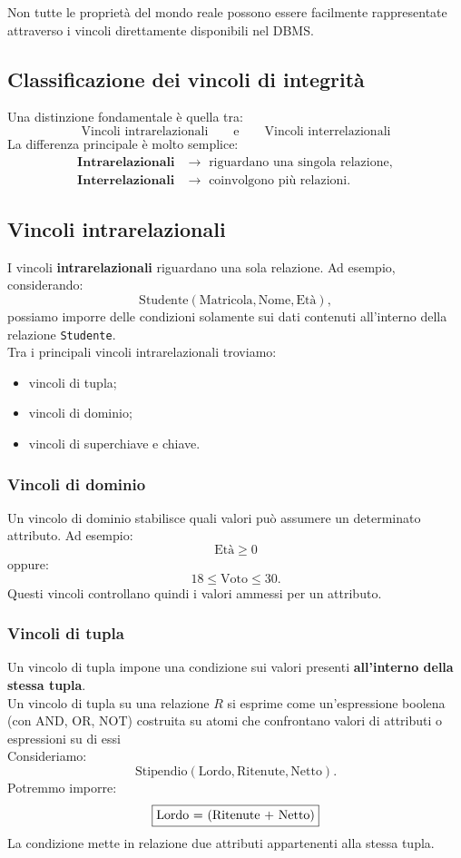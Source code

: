 Non tutte le proprietà del mondo reale possono essere facilmente
rappresentate attraverso i vincoli direttamente disponibili nel DBMS.

\subsection{Classificazione dei vincoli di integrità}
Una distinzione fondamentale è quella tra:
\[
\boxed{
\text{Vincoli intrarelazionali}
\qquad\text{e}\qquad
\text{Vincoli interrelazionali}
}
\]
La differenza principale è molto semplice:
\[
\boxed{
\begin{array}{ll}
\textbf{Intrarelazionali} &
\rightarrow \text{ riguardano una singola relazione}, \\[2mm]
\textbf{Interrelazionali} &
\rightarrow \text{ coinvolgono più relazioni}.
\end{array}
}
\]


\subsection*{Vincoli intrarelazionali}
I vincoli \textbf{intrarelazionali} riguardano una sola relazione.
Ad esempio, considerando:
\[
\text{Studente}(\text{Matricola},\text{Nome},\text{Età}),
\]
possiamo imporre delle condizioni solamente sui dati contenuti
all'interno della relazione \texttt{Studente}.\\
Tra i principali vincoli intrarelazionali troviamo:
\begin{itemize}
    \item vincoli di tupla;
    \item vincoli di dominio;
    \item vincoli di superchiave e chiave.
\end{itemize}
\subsubsection{Vincoli di dominio}
Un vincolo di dominio stabilisce quali valori può assumere
un determinato attributo.
Ad esempio:
\[
\text{Età} \geq 0
\]
oppure:
\[
18 \leq \text{Voto} \leq 30.
\]
Questi vincoli controllano quindi i valori ammessi per un attributo.
\subsubsection{Vincoli di tupla}
Un vincolo di tupla impone una condizione sui valori presenti
\textbf{all'interno della stessa tupla}.\\
Un vincolo di tupla su una relazione $R$ si esprime come un'espressione boolena (con AND, OR, NOT) costruita su atomi che confrontano valori di attributi o espressioni su di essi\\
Consideriamo:
\[
\text{Stipendio}(\text{Lordo},\text{Ritenute},\text{Netto}).
\]
Potremmo imporre:
\[
\boxed{
\text{Lordo } $=$ \text{ }(\text{Ritenute } $+$ \text{ Netto})
}
\]
La condizione mette in relazione due attributi appartenenti alla
stessa tupla.
